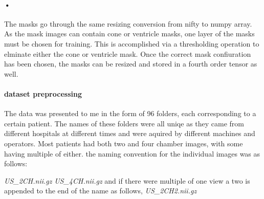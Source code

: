 \documentclass{article}
\begin{document}
\paragraph{•}
The masks go through the same resizing conversion from nifty to numpy array. As the mask images can contain cone or ventricle masks, one layer of the masks must be chosen for training. This is accomplished via a thresholding operation to elminate either the cone or ventricle mask. Once the correct mask confiuration has been chosen, the masks can be resized and stored in a fourth order tensor as well.
\paragraph{dataset preprocessing}
The data was presented to me in the form of 96 folders, each corresponding to a certain patient.
The names of these folders were all uniqe as they came from different hospitals at different times and were aquired by different machines and operators.
Most patients had both two and four chamber images, with some having multiple of either. 
the naming convention for the individual images was as follows:

\textit{US\_2CH.nii.gz}
\textit{US\_4CH.nii.gz}
and if there were multiple of one view a two is appended to the end of the name as follows,
\textit{US\_2CH2.nii.gz}
\end{document}
